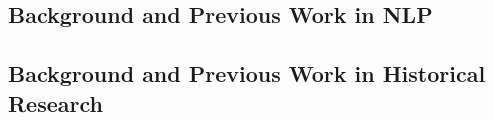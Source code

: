 
\subsection {Background and Previous Work in NLP}
\label{sec:background_and_previous?work_in_nlp}

\subsection {Background and Previous Work in Historical Research}
\label{sec:background_and_previous?work_in_historical_research}